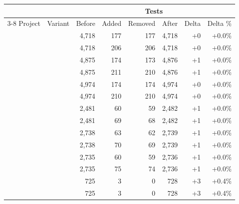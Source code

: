   \begin{tabular*}{\linewidth}{@{\hspace{\tabcolsep}\extracolsep{\fill}}llrrrrrr}
  \toprule
   &  & \multicolumn{6}{c}{Tests} \\
  \cmidrule(lr){3-8}
  Project & Variant & Before & Added & Removed & After & Delta & Delta \% \\
  \midrule
  \DatasetEqBenchA{} & \VariantNaiveC{} & 4,718 & 177 & 177 & 4,718 & +0 & +0.0\% \\
  \DatasetEqBenchA{} & \VariantImprovedC{} & 4,718 & 206 & 206 & 4,718 & +0 & +0.0\% \\
  \DatasetEqBenchB{} & \VariantNaiveC{} & 4,875 & 174 & 173 & 4,876 & +1 & +0.0\% \\
  \DatasetEqBenchB{} & \VariantImprovedC{} & 4,875 & 211 & 210 & 4,876 & +1 & +0.0\% \\
  \DatasetEqBenchC{} & \VariantNaiveC{} & 4,974 & 174 & 174 & 4,974 & +0 & +0.0\% \\
  \DatasetEqBenchC{} & \VariantImprovedC{} & 4,974 & 210 & 210 & 4,974 & +0 & +0.0\% \\
  \midrule
  \DatasetCommonsA{} & \VariantNaiveC{} & 2,481 & 60 & 59 & 2,482 & +1 & +0.0\% \\
  \DatasetCommonsA{} & \VariantImprovedC{} & 2,481 & 69 & 68 & 2,482 & +1 & +0.0\% \\
  \DatasetCommonsB{} & \VariantNaiveC{} & 2,738 & 63 & 62 & 2,739 & +1 & +0.0\% \\
  \DatasetCommonsB{} & \VariantImprovedC{} & 2,738 & 70 & 69 & 2,739 & +1 & +0.0\% \\
  \DatasetCommonsC{} & \VariantNaiveC{} & 2,735 & 60 & 59 & 2,736 & +1 & +0.0\% \\
  \DatasetCommonsC{} & \VariantImprovedC{} & 2,735 & 75 & 74 & 2,736 & +1 & +0.0\% \\
  \midrule
  \DatasetCommonsDev{} & \VariantNaiveC{} & 725 & 3 & 0 & 728 & +3 & +0.4\% \\
  \DatasetCommonsDev{} & \VariantImprovedC{} & 725 & 3 & 0 & 728 & +3 & +0.4\% \\
  \bottomrule
  \end{tabular*}
